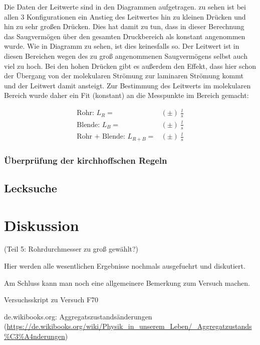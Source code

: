 \documentclass[12pt, a4paper]{scrartcl}
\begin{document}
        Die Daten der Leitwerte sind in den Diagrammen
        aufgetragen. zu sehen ist bei allen 3 Konfigurationen ein Anstieg des Leitwertes hin zu kleinen Drücken
        und hin zu sehr großen Drücken.
        Dies hat damit zu tun, dass in dieser Berechnung das Saugvermögen über den gesamten Druckbereich als konstant angenommen wurde. Wie in Diagramm
        zu sehen, ist dies keinesfalls so.
        Der Leitwert ist in diesen Bereichen wegen des zu groß angenommenen Saugvermögens selbst auch viel zu hoch. Bei den hohen Drücken gibt es außerdem den Effekt, dass hier schon der Übergang von der molekularen Strömung zur laminaren Strömung kommt und der Leitwert damit ansteigt.
        Zur Bestimmung des Leitwerts im molekularen Bereich wurde daher ein Fit (konstant) an die Messpunkte im Bereich 
        gemacht:
        
        \begin{align*}
            \text{Rohr: }L_R=&(\pm)\ \frac l s\\
            \text{Blende: } L_B=&(\pm)\ \frac l s\\
            \text{Rohr + Blende: } L_{R+B}=&(\pm)\ \frac l s
        \end{align*}
        
        \subsubsection*{Überprüfung der kirchhoffschen Regeln}
    
    \subsection{Lecksuche}
	
	\section{Diskussion}
    
    (Teil 5: Rohrdurchmesser zu groß gewählt?)
	
	Hier werden alle wesentlichen Ergebnisse nochmals ausgefuehrt und diskutiert. 
	
	Am Schluss kann man noch eine allgemeinere Bemerkung zum Versuch machen.
	
	
	\newpage 
	
	\begin{thebibliography}{00}   %
		
		 Versuchsskript zu Versuch F70
		
		 de.wikibooks.org: Aggregatszustandsänderungen\\ (\url{https://de.wikibooks.org/wiki/Physik_in_unserem_Leben/_Aggregatzustands%C3%A4nderungen})
		
	\end{thebibliography}
	
\end{document}
